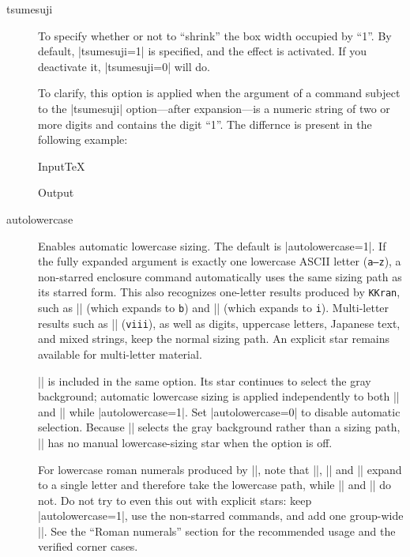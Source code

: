 \documentclass[luatex,fontsize=8pt,paper=b5,twoside]{jlreq}%
\begin{document}
\begin{description}
  \item[tsumesuji] To specify whether or not to ``shrink'' the box width occupied by ``1''. By default, \KKverb|tsumesuji=1| is specified, and the effect is activated. If you deactivate it, \KKverb|tsumesuji=0| will do.

  To clarify, this option is applied when the argument of a command subject to the \KKverb|tsumesuji| option—after expansion—is a numeric string of two or more digits and contains the digit ``1''. The differnce is present in the following example:
  \begin{SourceCode}{Input}{TeX}

  \end{SourceCode}
  \begin{OutPut}{Output}

  \end{OutPut}

  \item[autolowercase] Enables automatic lowercase sizing. The default is
  \KKverb|autolowercase=1|. If the fully expanded argument is exactly one
  lowercase ASCII letter (\texttt{a--z}), a non-starred enclosure command
  automatically uses the same sizing path as its starred form. This also
  recognizes one-letter results produced by \texttt{KKran}, such as
  \KKverb|| (which expands to \texttt{b}) and
  \KKverb|| (which expands to \texttt{i}). Multi-letter results such
  as \KKverb|| (\texttt{viii}), as well as digits, uppercase letters,
  Japanese text, and mixed strings, keep the normal sizing path. An explicit
  star remains available for multi-letter material.

  \KKverb|\jegg| is included in the same option. Its star continues to select
  the gray background; automatic lowercase sizing is applied independently to
  both \KKverb|| and \KKverb|| while
  \KKverb|autolowercase=1|. Set \KKverb|autolowercase=0| to disable automatic
  selection. Because \KKverb|\jegg*| selects the gray background rather than a
  sizing path, \KKverb|\jegg| has no manual lowercase-sizing star when the
  option is off.

  For lowercase roman numerals produced by \KKverb||, note that
  \KKverb||, \KKverb|| and \KKverb|| expand to a
  single letter and therefore take the lowercase path, while \KKverb||
  and \KKverb|| do not. Do not try to even this out with explicit
  stars: keep \KKverb|autolowercase=1|, use the non-starred commands, and add
  one group-wide \KKverb||. See the ``Roman numerals''
  section for the recommended usage and the verified corner cases.


\end{description}
\end{document}
